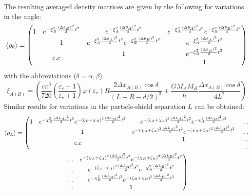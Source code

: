 The resulting averaged density matrices are given by the following for variations in the angle:
\begin{equation}
  \mean{\rho_{\theta}} = \begin{pmatrix}
    1 & e^{-\xi_B^2\frac{(\Delta \theta_B)^2}{2}t^2} & e^{-\xi_A^2\frac{(\Delta \theta_A)^2}{2}t^2} & e^{-\xi_A^2\frac{(\Delta \theta_A)^2}{2}t^2}e^{-\xi_B^2\frac{(\Delta \theta_B)^2}{2}t^2}\\
    & 1 & e^{-\xi_A^2\frac{(\Delta \theta_A)^2}{2}t^2}e^{-\xi_B^2\frac{(\Delta \theta_B)^2}{2}t^2} & e^{-\xi_A^2\frac{(\Delta \theta_A)^2}{2}t^2}\\
    \multicolumn{2}{c}{\multirow{2}{*}{c.c}} & 1 & e^{-\xi_B^2\frac{(\Delta \theta_B)^2}{2}t^2}\\
    & & & 1
  \end{pmatrix}
\end{equation}
with the abbreviations ($\delta = \alpha,\beta$)
\begin{equation}\label{eq:apx:definition-xi}
  \xi_{A(B)} = \left(\frac{c \pi^3}{720} \left(\frac{\varepsilon_r - 1}{\varepsilon_r + 1}\right)\varphi(\varepsilon_r) R \frac{2\Delta x_{A(B)} \cos\delta}{(L-R-d/2)^3} + \frac{G M_A M_B}{\hbar} \frac{\Delta x_{A(B)} \cos\delta}{4L^2}\right)
\end{equation}
Similar results for variations in the particle-shield separation $L$ can be obtained:
\begin{multline}
  \mean{\rho_{L}} = \left(\begin{matrix}
    1 & e^{-\chi_B^2\frac{(\Delta L_A)^2}{2}t^2}e^{-(\zeta_B + \chi_B)^2\frac{(\Delta L_B)^2}{2}t^2} & e^{-(\zeta_A+\chi_A)^2\frac{(\Delta L_A)^2}{2}t^2}e^{-\chi_A^2\frac{(\Delta L_B)^2}{2}t^2} & \dots \\
    & 1 & e^{-(\chi_A+\zeta_A)^2\frac{(\Delta L_A)^2}{2}t^2}e^{-(\chi_B+\zeta_B)^2\frac{(\Delta L_B)^2}{2}t^2} & \dots\\
    \multicolumn{2}{c}{\multirow{2}{*}{c.c}} & 1 & \dots\\
    & & & \dots
  \end{matrix}\right. \\
  \left.\begin{matrix}
    \dots & e^{-(\chi_A+\zeta_A)^2\frac{(\Delta L_A)^2}{2}t^2}e^{-(\chi_B+\zeta_B)^2\frac{(\Delta L_B)^2}{2}t^2} \\
    \dots & e^{-(\zeta_A+\chi_A)^2\frac{(\Delta L_A)^2}{2}t^2}e^{-\chi_A^2\frac{(\Delta L_B)^2}{2}t^2} \\
    \dots & e^{-\chi_B^2\frac{(\Delta L_A)^2}{2}t^2}e^{-(\zeta_B + \chi_B)^2\frac{(\Delta L_B)^2}{2}t^2} \\
    \dots & 1
  \end{matrix}\right)
\end{multline}
